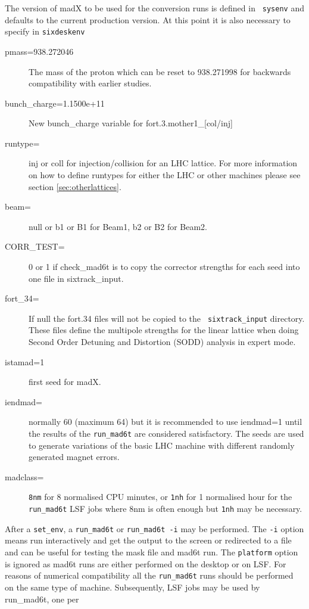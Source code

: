 \documentclass{cernatsnote}
\begin{document}
The version of madX to be used for the conversion runs is defined in {\tt
sysenv} and defaults to the current production version.  At this point it is
also necessary to specify in \texttt{sixdeskenv}
\begin{description}
\item [pmass=938.272046] The mass of the proton \cite{NIST} which can be reset
  to 938.271998 for backwards compatibility with earlier studies.
\item [bunch\_charge=1.1500e+11] New bunch\_charge variable for
  fort.3.mother1\_[col/inj]
\item [runtype=] inj or coll for injection/collision for an LHC lattice.  For
  more information on how to define runtypes for either the LHC or other
  machines please see section \ref{sec:otherlattices}.
\item [beam=] null or b1 or B1 for Beam1, b2 or B2 for Beam2.
\item [CORR\_TEST=]0 or 1 if check\_mad6t is to copy the corrector strengths
for each seed into one file in sixtrack\_input.
\item [fort\_34=] If null the fort.34 files will not be copied to the {\tt
  sixtrack\_input} directory. These files define the multipole strengths for
  the linear lattice when doing Second Order Detuning and Distortion (SODD)
  analysis in expert mode.
\item [istamad=1] first seed for madX.
\item [iendmad=] normally 60 (maximum 64) but it is recommended to use
  iendmad=1 until the results of the \texttt{run\_mad6t} are considered
  satisfactory.  The seeds are used to generate variations of the basic LHC
  machine with different randomly generated magnet errors.
\item[madclass=] \texttt{8nm} for 8 normalised CPU minutes, or \texttt{1nh} for 1
  normalised hour for the \texttt{run\_mad6t} LSF jobs where 8nm is often enough
  but \texttt{1nh} may be necessary.
\end{description}
After a \texttt{set\_env}, a \texttt{run\_mad6t} or \texttt{run\_mad6t -i} may
be performed.  The \texttt{-i} option means run interactively and get the
output to the screen or redirected to a file and can be useful for testing the
mask file and mad6t run.  The \texttt{platform} option is ignored as mad6t
runs are either performed on the desktop or on LSF. For reasons of numerical
compatibility all the \texttt{run\_mad6t} runs should be performed on the same
type of machine.  Subsequently, LSF jobs may be used by {run\_mad6t}, one per
\end{document}
